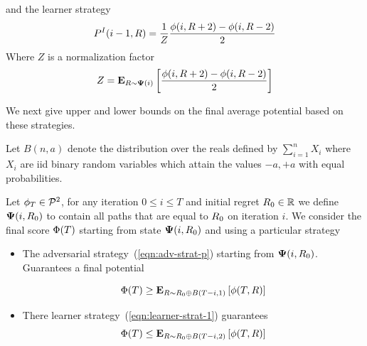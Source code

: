 \documentclass{article}[12pt]
\begin{document}
and the learner strategy
\begin{equation} \label{eqn:learner-strat-1}
P^I(i-1,R) = \frac{1}{Z} \frac{\phi(i,R+2) - \phi(i,R-2)}{2}
\end{equation}
Where $Z$ is a normalization factor
$$Z = {\bf E}_{R \sim {\bf \Psi}(i)}\left[ \frac{\phi(i,R+2) - \phi(i,R-2)}{2} \right]$$

We next give upper and lower bounds on the final average potential
based on these strategies.

Let $B(n,a)$ denote the distribution over the reals defined by
$\sum_{i=1}^n X_i$ where $X_i$ are iid binary random variables which
attain the values $-a,+a$ with equal probabilities.

\begin{theorem} \label{thm:IntegerGameBounds}
  Let $\phi_T \in {\cal P}^{2}$, for any iteration $0 \leq i \leq T$ and
  initial regret $R_0 \in \mathbb{R}$ we define ${\bf \Psi}(i,R_0)$ to
  contain all paths that are equal to $R_0$ on iteration $i$. We
  consider the final score $\Phi(T)$ starting from state
  ${\bf \Psi}(i,R_0)$ and using a particular strategy
  \begin{itemize}
  \item
    The adversarial strategy~(\ref{eqn:adv-strat-p}) starting from
    ${\bf \Psi}(i,R_0)$. Guarantees a final potential 
     
    $$\Phi(T) \geq {\bf E}_{R \sim R_0 \oplus B(T-i,1)}\left[ \phi(T,R) \right]$$
  \item
    There learner strategy~(\ref{eqn:learner-strat-1}) guarantees 
    $$\Phi(T) \leq {\bf E}_{R \sim R_0 \oplus B(T-i,2)}\left[ \phi(T,R) \right]$$
  \end{itemize}
\end{theorem}

\end{document}
